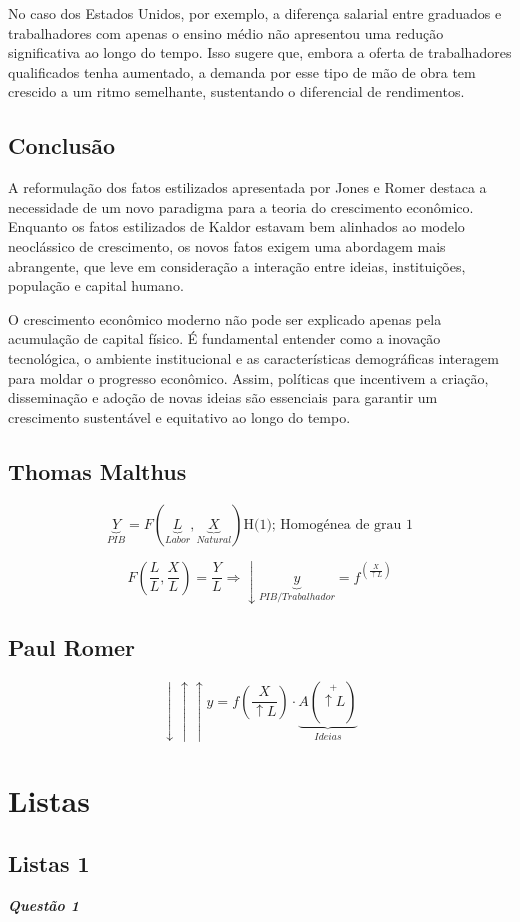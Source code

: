 \documentclass[a4paper,12pt]{article}[abntex2]
\begin{document}
No caso dos Estados Unidos, por exemplo, a diferença salarial entre graduados e trabalhadores com apenas o ensino médio não apresentou uma redução significativa ao longo do tempo. Isso sugere que, embora a oferta de trabalhadores qualificados tenha aumentado, a demanda por esse tipo de mão de obra tem crescido a um ritmo semelhante, sustentando o diferencial de rendimentos.

\subsection{Conclusão}
A reformulação dos fatos estilizados apresentada por Jones e Romer destaca a necessidade de um novo paradigma para a teoria do crescimento econômico. Enquanto os fatos estilizados de Kaldor estavam bem alinhados ao modelo neoclássico de crescimento, os novos fatos exigem uma abordagem mais abrangente, que leve em consideração a interação entre ideias, instituições, população e capital humano.

O crescimento econômico moderno não pode ser explicado apenas pela acumulação de capital físico. É fundamental entender como a inovação tecnológica, o ambiente institucional e as características demográficas interagem para moldar o progresso econômico. Assim, políticas que incentivem a criação, disseminação e adoção de novas ideias são essenciais para garantir um crescimento sustentável e equitativo ao longo do tempo.

\subsection{\textbf{Thomas Malthus}}
\[
\underbrace{Y}_{PIB}=F(\underbrace{L}_{Labor},\underbrace{X}_{Natural})\text{H(1); Homogénea de grau 1}
\]

\[
F(\frac{L}{L},\frac{X}{L})=\frac{Y}{L} \Rightarrow\downarrow \underbrace{y}_{PIB/Trabalhador}=f^(\frac{X}{\uparrow L})
\]

\subsection{\textbf{Paul Romer}}
\[
\downarrow \uparrow \uparrow y = f\left( \frac{X}{\uparrow L} \right) \cdot \underbrace{A\left(\overset{+}{\uparrow L}\right)}_{Ideias}
\]

\newpage
\section{\textbf{Listas}}
\subsection{\textbf{Listas 1}}
\textbf{\textit{Questão 1}}
\end{document}
